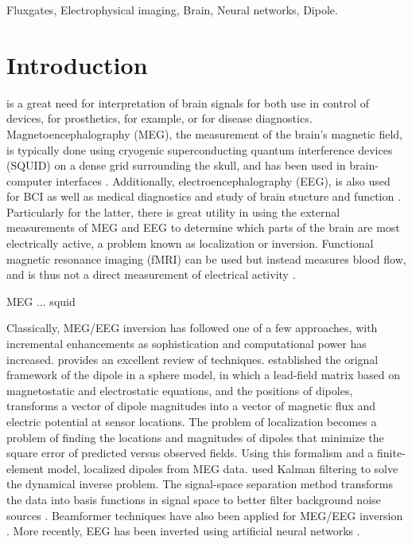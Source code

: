 \documentclass[journal,12pt,onecolumn,draftclsnofoot]{IEEEtran}
\begin{document}
\begin{IEEEkeywords}
Fluxgates, Electrophysical imaging, Brain, Neural networks, Dipole.
\end{IEEEkeywords}



\IEEEpeerreviewmaketitle



\section{Introduction}

 is a great need for interpretation of brain signals for both use in control of devices, for prosthetics, for example, or for disease diagnostics. Magnetoencephalography (MEG), the measurement of the brain's magnetic field, is typically done using cryogenic superconducting quantum interference devices (SQUID) on a dense grid surrounding the skull, and has been used in brain-computer interfaces \cite{mellinger2007meg}. Additionally, electroencephalography (EEG), is also used for BCI as well as medical diagnostics and study of brain stucture and function \cite{da2008impact}. Particularly for the latter, there is great utility in using the external measurements of MEG and EEG to determine which parts of the brain are most electrically active, a problem known as localization or inversion. Functional magnetic resonance imaging (fMRI) can be used but instead measures blood flow, and is thus not a direct measurement of electrical activity \cite{sharon2007advantage}.

MEG ...
squid
\cite{ilmoniemi1984four}
\cite{preusser2009microfabricated}
\cite{primdahl1979fluxgate}
\cite{sasada2014fundamental}

Classically, MEG/EEG inversion has followed one of a few approaches, with incremental enhancements as sophistication and computational power has increased. \cite{grech2008review} provides an excellent review of techniques. \cite{mosher1992multiple} established the orignal framework of the dipole in a sphere model, in which a lead-field matrix based on magnetostatic and electrostatic equations, and the positions of dipoles, transforms a vector of dipole magnitudes into a vector of magnetic flux and electric potential at sensor locations. The problem of localization becomes a problem of finding the locations and magnitudes of dipoles that minimize the square error of predicted versus observed fields. Using this formalism and a finite-element model, \cite{buchner1997inverse} localized dipoles from MEG data. \cite{galka2004solution} used Kalman filtering to solve the dynamical inverse problem. The signal-space separation method transforms the data into basis functions in signal space to better filter background noise sources \cite{taulu2005applications}. Beamformer techniques have also been applied for MEG/EEG inversion \cite{sekihara2001reconstructing}. More recently, EEG has been inverted using artificial neural networks \cite{van2000eeg}.
\end{document}
